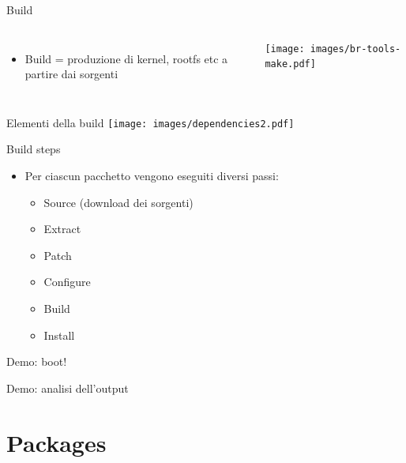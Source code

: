 \documentclass[xetex,table]{beamer}
\begin{document}
\begin{frame}{Build}
  \begin{columns}
    \begin{itemize}
      \item Build = produzione di kernel, rootfs etc a partire dai
        sorgenti
    \end{itemize}
    \texttt{[image: images/br-tools-make.pdf]}
  \end{columns}
\end{frame}

\begin{frame}{Elementi della build}
  \center\texttt{[image: images/dependencies2.pdf]}
\end{frame}

\begin{frame}{Build steps}
  \begin{itemize}
  \item Per ciascun pacchetto vengono eseguiti diversi passi:
    \begin{itemize}
    \item Source (download dei sorgenti)
    \item Extract
    \item Patch
    \item Configure
    \item Build
    \item Install
    \end{itemize}
  \end{itemize}
\end{frame}

\begin{frame}[standout]
  Demo: boot!
\end{frame}

\begin{frame}[standout]
  Demo: analisi dell'output
\end{frame}

\section{Packages}
\end{document}
